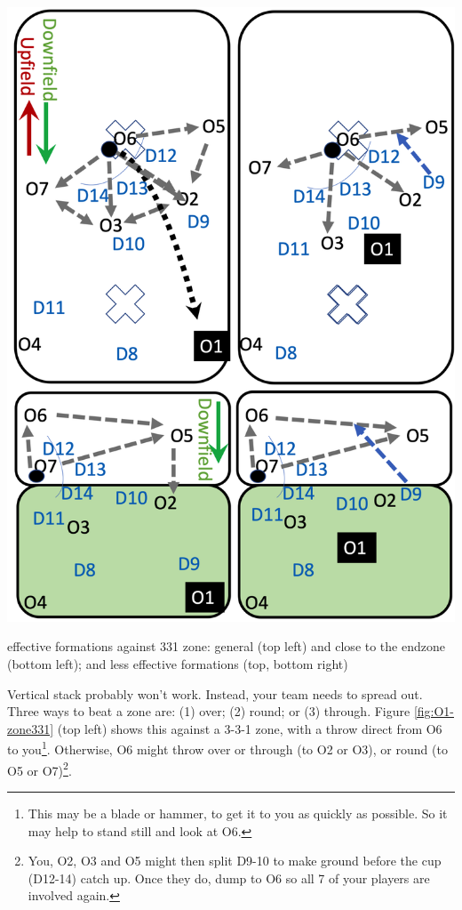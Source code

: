 \documentclass{tufte-handout}
\begin{document}
\begin{marginfigure}%
  \includegraphics[width=\linewidth]{O1-zone331}
  \caption{effective formations against 331 zone: 
  general (top left)
  and close to the endzone (bottom left); and 
  less effective formations (top, bottom right)}
  \label{fig:O1-zone331}
\end{marginfigure}

Vertical stack 
probably won't work. 
Instead, your 
team needs to 
spread out. 
Three ways to beat a zone are:
(1) over;
(2) round; or
(3) through. 
Figure \ref{fig:O1-zone331}
(top left)
shows this 
against a 
3-3-1 zone, 
with a throw 
direct 
from O6 
 to you\footnote{
This may be a 
blade or
hammer, 
to get it 
to you
as quickly as possible.
So it may help to 
stand still 
and look at O6.}.
Otherwise, 
O6 might throw
over or through (to O2 or O3), 
or round (to O5 or O7)\footnote{
You, 
O2, 
O3 and
O5
might then split
D9-10
to make ground 
before the cup 
(D12-14) catch up. 
Once they do, 
dump to O6 
so all 7 of your players
are involved again.}. 
\end{document}
